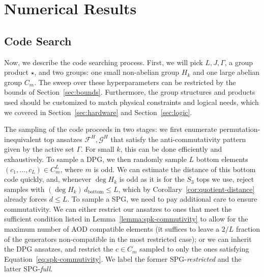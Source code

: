 \section{Numerical Results}
\subsection{Code Search}
Now, we describe the code searching process. First, we will pick $L, J, \Gamma$, a group product $\star$, and two groups: one small non-abelian group $H_k$ and one large abelian group $C_m$. The sweep over these hyperparameters can be restricted by the bounds of Section~\ref{sec:bounds}. Furthermore, the group structures and products used should be customized to match physical constraints and logical needs, which we covered in Section~\ref{sec:hardware} and Section~\ref{sec:logic}.

The sampling of the code proceeds in two stages: we first enumerate permutation-inequivalent top ansatzes $\mathcal{F}^H, \mathcal{G}^H$ that satisfy the anti-commutativity pattern given by the active set $\Gamma$. For small $k$, this can be done efficiently and exhaustively. To sample a DPG, we then randomly sample $L$ bottom elements $(c_1,...,c_L)\in C^L_m$, where $m$ is odd. We can estimate the distance of this bottom code quickly, and, whenever $\deg H_k$ is odd as it is for the $S_3$ tops we use, reject samples with $(\deg H_k)\,d_{\mathrm{bottom}}\leq L$, which by Corollary~\ref{cor:quotient-distance} already forces $d\leq L$. To sample a SPG, we need to pay additional care to ensure commutativity. We can either restrict our ansatzes to ones that meet the sufficient condition listed in Lemma~\ref{lemma:spk-commutivity} to allow for the maximum number of AOD compatible elements (it suffices to leave a $2/L$ fraction of the generators non-compatible in the most restricted case); or we can inherit the DPG ansatzes, and restrict the $c\in C_m$ sampled to only the ones satisfying Equation~\eqref{eq:spk-commutivity}. We label the former SPG-\emph{restricted} and the latter SPG-\emph{full}.

